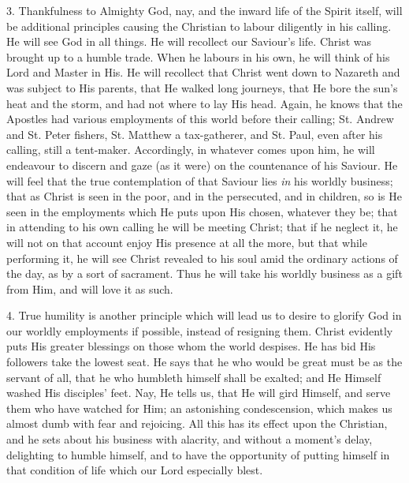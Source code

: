 3. Thankfulness to Almighty God, nay, and the inward life of the
Spirit itself, will be additional principles causing the Christian to
labour diligently in his calling. He will see God in all things. He
will recollect our Saviour's life. Christ was brought up to a humble
trade. When he labours in his own, he will think of his Lord and
Master in His. He will recollect that Christ went down to Nazareth and
was subject to His parents, that He walked long journeys, that He bore
the sun's heat and the storm, and had not where to lay His head.
Again, he knows that the Apostles had various employments of this
world before their calling; St. Andrew and St. Peter fishers, St.
Matthew a tax-gatherer, and St. Paul, even after his calling, still a
tent-maker. Accordingly, in whatever comes upon him, he will endeavour
to discern and gaze (as it were) on the countenance of his Saviour. He
will feel that the true contemplation of that Saviour lies \emph{in} his
worldly business; that as Christ is seen in the poor, and in the
persecuted, and in children, so is He seen in the employments which He
puts upon His chosen, whatever they be; that in attending to his own
calling he will be meeting Christ; that if he neglect it, he will not
on that account enjoy His presence at all the more, but that while
performing it, he will see Christ revealed to his soul amid the
ordinary actions of the day, as by a sort of sacrament. Thus he will
take his worldly business as a gift from Him, and will love it as
such.

4. True humility is another principle which will lead us to desire
to glorify God in our worldly employments if possible, instead of
resigning them. Christ evidently puts His greater blessings on those
whom the world despises. He has bid His followers take the lowest
seat. He says that he who would be great must be as the servant of
all, that he who humbleth himself shall be exalted; and He Himself
washed His disciples' feet. Nay, He tells us, that He will gird
Himself, and serve them who have watched for Him; an astonishing
condescension, which makes us almost dumb with fear and rejoicing. All
this has its effect upon the Christian, and he sets about his business
with alacrity, and without a moment's delay, delighting to humble
himself, and to have the opportunity of putting himself in that
condition of life which our Lord especially blest.

